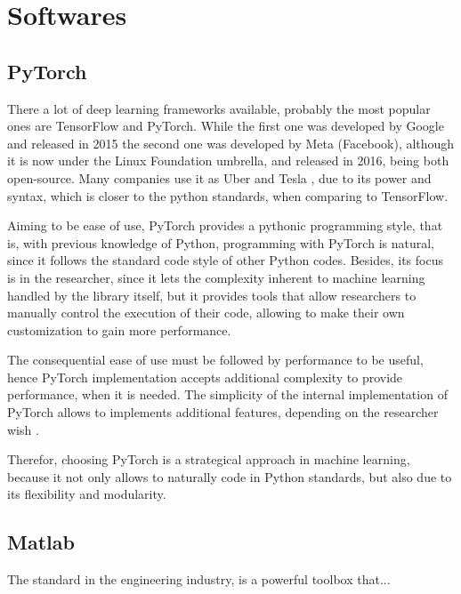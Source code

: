 \section{Softwares}

\subsection{PyTorch}

There a lot of deep learning frameworks available, probably the most popular ones are TensorFlow and PyTorch. 
While the first one was developed by Google and released in 2015 the second one was developed by Meta (Facebook), although it is now under the Linux Foundation umbrella, and released in 2016, being both open-source.
Many companies use it as Uber \citep{goodman2017} and Tesla \citep{pytorch2019}, due to its power and syntax, which is closer to the python standards, when comparing to TensorFlow.


Aiming to be ease of use, PyTorch provides a pythonic programming style, that is, with previous knowledge of Python, programming with PyTorch is natural, since it follows the standard code style of other Python codes.
Besides, its focus is in the researcher, since it lets the complexity inherent to machine learning handled by the library itself, but it provides tools that allow researchers to manually control the execution of their code, allowing to make their own customization to gain more performance.

The consequential ease of use must be followed by performance to be useful, hence PyTorch implementation accepts additional complexity to provide performance, when it is needed.
The simplicity of the internal implementation of PyTorch allows to implements additional features, depending on the researcher wish \citep{paszke2019}.

Therefor, choosing PyTorch is a strategical approach in machine learning, because it not only allows to naturally code in Python standards, but also due to its flexibility and modularity.

\subsection{Matlab}

The standard in the engineering industry, \matlab is a powerful toolbox that...